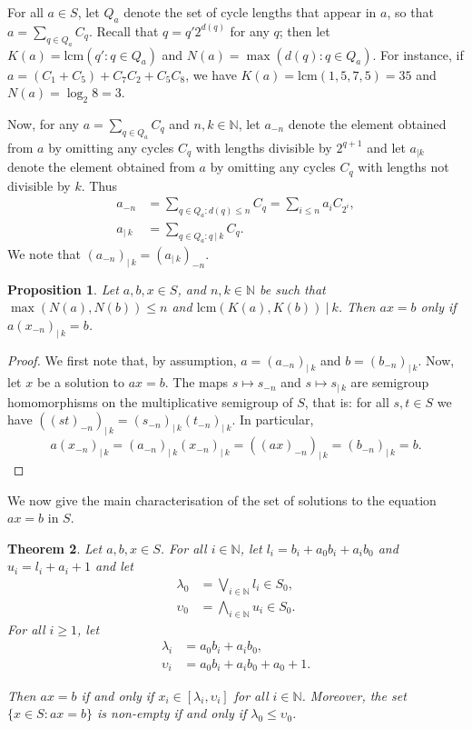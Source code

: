 \documentclass[a4paper, 11pt]{article}
\theoremstyle{plain}
\newtheorem{theorem}{Theorem}[section]
\newtheorem{proposition}[theorem]{Proposition}
\theoremstyle{definition}
\newcommand{\N} {\mathbb{N}}
\newcommand{\bigjoin}   {\bigvee}
\newcommand{\bigmeet}   {\bigwedge}
\newcommand{\lcm}       {\mathrm{lcm}}
\begin{document}
For all $a \in S$, let $Q_a$ denote the set of cycle lengths that appear in $a$, so that $a = \sum_{q \in Q_a} C_q$. Recall that $q = q' 2^{ d( q ) }$ for any $q$; then let $K(a) = \lcm( q' : q \in Q_a )$ and $N(a) = \max( d(q) : q \in Q_a )$. For instance, if $a = (C_1 + C_5) + C_7 C_2 + C_5C_8$, we have $K(a) = \lcm( 1, 5, 7, 5 ) = 35$ and $N(a) = \log_2 8 = 3$.

Now, for any $a = \sum_{q \in Q_a} C_q$ and $n, k \in \N$, let $a_{-n}$ denote the element obtained from $a$ by omitting any cycles $C_q$ with lengths divisible by $2^{q+1}$ and let $a_{|k}$ denote the element obtained from $a$ by omitting any cycles $C_q$ with lengths not divisible by $k$. Thus
\begin{align*}
    a_{-n} &= \sum_{q \in Q_a : d(q) \le n} C_q =  \sum_{i \le n} a_i C_{2^i},\\
    a_{ | \ k} &= \sum_{q \in Q_a : q \ | \ k} C_q.
\end{align*}
We note that $(a_{ -n})_{| \ k} = (a_{| \ k})_{-n}$.

\begin{proposition} \label{proposition:division_small_cycles}
Let $a,b, x \in S$, and $n, k \in \N$ be such that $\max( N(a), N(b) ) \le n$ and $\lcm( K( a ) , K( b ) ) \ | \ k$. Then $ax = b$ only if $a (x_{-n})_{| \ k} = b$.
\end{proposition}

\begin{proof}
We first note that, by assumption, $a = (a_{-n})_{| \ k}$ and $b = (b_{-n})_{| \ k}$. Now, let $x$ be a solution to $ax = b$. The maps $s \mapsto s_{-n}$ and $s \mapsto s_{| \ k}$ are semigroup homomorphisms on the multiplicative semigroup of $S$, that is: for all $s, t \in S$ we have $( (s t)_{-n})_{| \ k} = (s_{-n})_{| \ k} (t_{-n})_{| \ k}$. In particular, 
\[
    a(x_{-n})_{| \ k} = (a_{-n})_{| \ k} (x_{-n})_{| \ k} = ( (ax)_{-n} )_{| \ k} = ( b_{-n} )_{| \ k} = b.
\]
\end{proof}


We now give the main characterisation of the set of solutions to the equation $ax = b$ in $S$.


\begin{theorem} \label{theorem:ax=b}
Let $a, b, x \in S$. For all $i \in \N$, let $l_i = b_i + a_0 b_i + a_i b_0$ and $u_i = l_i + a_i + 1$ and let
\begin{align*}
    \lambda_0 &= \bigjoin_{i \in \N} l_i \in S_0, \\
    \upsilon_0 &= \bigmeet_{i \in \N} u_i \in S_0.
\end{align*}
For all $i \ge 1$, let
\begin{align*}
    \lambda_i &= a_0 b_i + a_i b_0, \\
    \upsilon_i &= a_0 b_i + a_i b_0 + a_0 + 1.
\end{align*}

Then $ax = b$ if and only if $x_i \in [ \lambda_i, \upsilon_i ]$ for all $i \in \N$. 
Moreover, the set $\{ x \in S: ax = b \}$ is non-empty if and only if $\lambda_0 \le \upsilon_0$.
\end{theorem}
\end{document}
